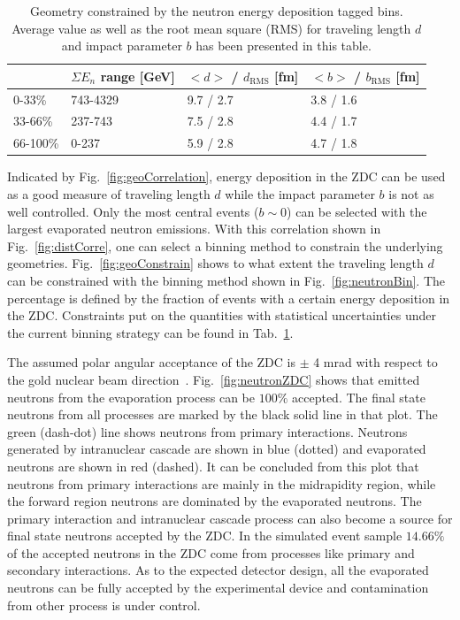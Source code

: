 \begin{table}[width=0.85\columnwidth]
\centering
\begin{tabular}{ |l || l | l | l | } \hline 
		& $\Sigma E_{n}$ range [GeV] & $<d>$ / $d_{\mathrm{RMS}}$ [fm] & $<b>$ / $b_{\mathrm{RMS}}$ [fm] 	\\ \hline
0-33\%	& 743-4329		&	9.7 / 2.7	& 3.8 / 1.6	 \\ \hline
33-66\%	& 237-743		&	7.5 / 2.8	& 4.4 / 1.7	\\ \hline
66-100\%& 0-237			&	5.9 / 2.8	& 4.7 / 1.8	\\ \hline
\end{tabular}
\caption[Constrained geometric quantity with the neutron binning method]{Geometry constrained by the neutron energy deposition tagged bins. Average value as well as the root mean square (RMS) for traveling length $d$ and impact parameter $b$ has been presented in this table.}
\label{tab:geoConstr}
\end{table}


Indicated by Fig.~\ref{fig:geoCorrelation}, energy deposition in the ZDC can be used
as a good measure of traveling length $d$ while the impact parameter $b$ is not as
well controlled. 
Only the most central events ($b\sim0$) can be selected with the largest
evaporated neutron emissions. With this correlation shown in
Fig.~\ref{fig:distCorre}, one can select a binning method to constrain the
underlying geometries. Fig.~\ref{fig:geoConstrain} shows to what extent the
traveling length $d$ can be constrained with the binning method shown in
Fig.~\ref{fig:neutronBin}. The percentage is defined by the fraction of events with
a certain energy deposition in the ZDC.
Constraints put on the quantities with statistical uncertainties under the
current binning strategy can be found in Tab.~\ref{tab:geoConstr}.


The assumed polar angular acceptance of the ZDC is $\pm$ 4 mrad with respect to
the gold nuclear beam direction~\cite{Accardi:2012qut}.
Fig.~\ref{fig:neutronZDC} shows that emitted neutrons from the evaporation
process can be $100\%$ accepted. The final state neutrons from all processes are
marked by the black solid line in that plot. The green (dash-dot) line shows neutrons from
primary interactions. Neutrons generated by intranuclear cascade are shown in
blue (dotted) and evaporated neutrons are shown in red (dashed). It can be concluded from this
plot that neutrons from primary interactions are mainly in the midrapidity
region, while the forward region neutrons are dominated by the evaporated
neutrons. The primary interaction and intranuclear cascade process can also
become a source for final state neutrons accepted by the ZDC. In the simulated
event sample $14.66\%$ of the accepted neutrons in the ZDC come from processes
like primary and secondary interactions. As to the expected detector design, all
the evaporated neutrons can be fully accepted by the experimental device and
contamination from other process is under control.

